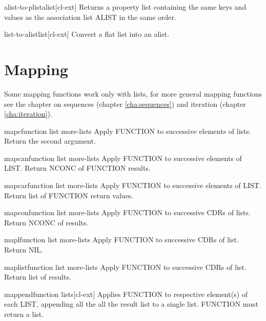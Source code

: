 \documentclass[10pt,english]{book}
\begin{document}
\begin{function}{alist-to-plist}{alist}[cl-ext]
  Returns a property list containing the same keys and values as the
association list ALIST in the same order.
\end{function}

\begin{function}{list-to-alist}{list}[cl-ext]
  Convert a flat list into an alist.
\end{function}

\section{Mapping}
\label{sec:mapping}

Some mapping functions work only with lists, for more general mapping
functions see the chapter on sequences (chapter \ref{cha:sequences}) and
iteration (chapter \ref{cha:iteration}).

\begin{function}{mapc}{function list \rest more-lists}
  Apply FUNCTION to successive elements of lists. Return the second argument.
\end{function}

\begin{function}{mapcan}{function list \rest more-lists}
  Apply FUNCTION to successive elements of LIST. Return NCONC of FUNCTION
   results.
\end{function}

\begin{function}{mapcar}{function list \rest more-lists}
  Apply FUNCTION to successive elements of LIST. Return list of FUNCTION
   return values.
\end{function}

\begin{function}{mapcon}{function list \rest more-lists}
  Apply FUNCTION to successive CDRs of lists. Return NCONC of results.
\end{function}

\begin{function}{mapl}{function list \rest more-lists}
  Apply FUNCTION to successive CDRs of list. Return NIL.
\end{function}

\begin{function}{maplist}{function list \rest more-lists}
  Apply FUNCTION to successive CDRs of list. Return list of results.
\end{function}

\begin{function}{mappend}{function \rest lists}[cl-ext]
  Applies FUNCTION to respective element(s) of each LIST, appending all the
all the result list to a single list. FUNCTION must return a list.
\end{function}
\end{document}
